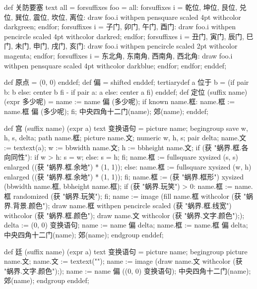 def 关防要塞 text all =
  forsuffixes foo = all:
    forsuffixes i = 乾位, 坤位, 艮位, 兑位, 巽位, 震位, 坎位, 离位:
      draw foo.i withpen pensquare scaled 4pt withcolor darkgreen;
    endfor;
    forsuffixes i = 子门, 卯门, 午门, 酉门:
      draw foo.i withpen pencircle scaled 4pt withcolor darkred;
    endfor;
    forsuffixes i = 丑门, 寅门, 辰门, 巳门, 未门, 申门, 戌门, 亥门:
      draw foo.i withpen pencircle scaled 2pt withcolor magenta;
    endfor;
    forsuffixes i = 东北角, 东南角, 西南角, 西北角:
      draw foo.i withpen pensquare scaled 4pt withcolor darkblue;
    endfor;
  endfor;
enddef;
\stopMPinclusions

\startMPinclusions[+]
def 原点 = (0, 0) enddef;
def 偏 = shifted enddef;
tertiarydef a 位于 b =
  (if pair b: b else: center b fi - if pair a: a else: center a fi)
enddef;
def 定位 (suffix name) (expr 多少呢) =
  name := name 偏 (多少呢);
  if known name.框:
    name.框 := name.框 偏 (多少呢);
  fi;
  中央四角十二门(name); 郊(name);
enddef;
\stopMPinclusions

\startMPinclusions[+]
def 宫 (suffix name) (expr a) text 变换语句 =
  picture name;
  begingroup
  save w, h, s, delta;
  path name.框; picture name.文; numeric w, h, s; pair delta;
  name.文 := textext(a);
  w := bbwidth name.文; h := bbheight name.文;
  if (获 "蜗界.框.各向同性"):
    if w > h: s = w; else: s = h; fi;
    name.框 := fullsquare xysized (s, s) enlarged ((获 "蜗界.框.余地") * (1, 1));
  else:
    name.框 := fullsquare xysized (w, h) enlarged ((获 "蜗界.框.余地") * (1, 1));
  fi;
  name.框 := (获 "蜗界.框形") xysized (bbwidth name.框, bbheight name.框);
  if (获 "蜗界.玩笑") > 0: name.框 := name.框 randomized (获 "蜗界.玩笑"); fi;
  name := image (fill name.框 withcolor (获 "蜗界.背景.颜色");
                 draw name.框 withpen pencircle scaled (获 "蜗界.框.线宽")
                         withcolor (获 "蜗界.框.颜色");
                 draw name.文 withcolor (获 "蜗界.文字.颜色"););
  delta := (0, 0) 变换语句;
  name := name 偏 delta;
  name.框 := name.框 偏 delta;
  中央四角十二门(name); 郊(name);
  endgroup
enddef;
\stopMPinclusions

\startMPinclusions[+]
def 廷 (suffix name) (expr a) text 变换语句 =
  picture name;
  begingroup
    picture name.文; name.文 := textext("");
    name := image (draw name.文 withcolor (获 "蜗界.文字.颜色"););
    name := name 偏 ((0, 0) 变换语句); 
    中央四角十二门(name); 郊(name);
  endgroup
enddef;
\stopMPinclusions

